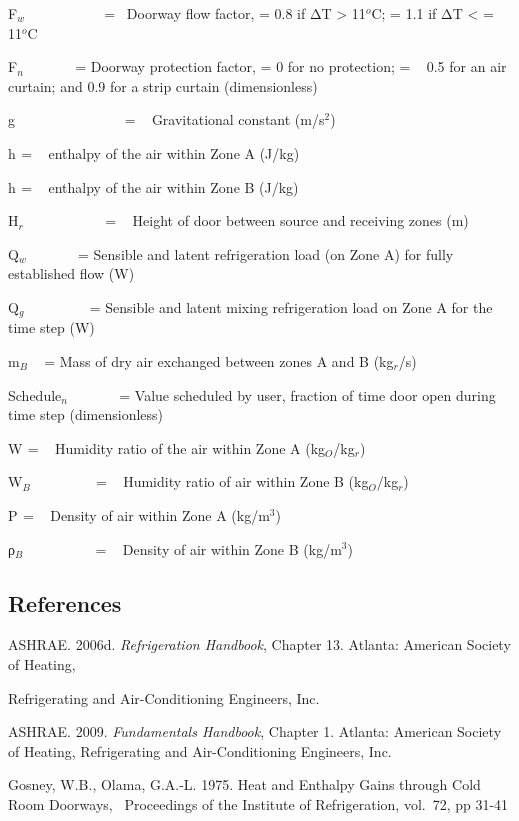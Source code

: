 F\(_{w}\) ~~~~~~~~~~ = ~Doorway flow factor, = 0.8 if ΔT \textgreater{} 11\(^{o}\)C; = 1.1 if ΔT \textless{} = 11\(^{o}\)C

F\(_{n}\) ~~~~~~ = Doorway protection factor, = 0 for no protection; = ~ 0.5 for an air curtain; and 0.9 for a strip curtain (dimensionless)

g~~~~~~~~~~~~~~~ = ~ Gravitational constant (m/s\(^{2}\))

h\(_{ }\) = ~ enthalpy of the air within Zone A (J/kg)

h\(_{ }\) = ~ enthalpy of the air within Zone B (J/kg)

H\(_{r}\)~~~~~~~~~~~ = ~ Height of door between source and receiving zones (m)

Q\(_{w}\) ~~~~~~ = Sensible and latent refrigeration load (on Zone A) for fully established flow (W)

Q\(_{g}\) ~~~~~~~~ = Sensible and latent mixing refrigeration load on Zone A for the time step (W)

m\(_{B}\) ~ = Mass of dry air exchanged between zones A and B (kg\(_{r}\)/s)

Schedule\(_{n}\) ~~~~~~ = Value scheduled by user, fraction of time door open during time step (dimensionless)

W\(_{ }\) = ~ Humidity ratio of the air within Zone A (kg\(_{O}\)/kg\(_{r}\))

W\(_{B}\) ~~~~~~~~ = ~ Humidity ratio of air within Zone B (kg\(_{O}\)/kg\(_{r}\))

Ρ\(_{ }\) = ~ Density of air within Zone A (kg/m\(^{3}\))

ρ\(_{B}\) ~~~~~~~~~ = ~ Density of air within Zone B (kg/m\(^{3}\))

\subsection{References}\label{references}

ASHRAE. 2006d. \emph{Refrigeration Handbook}, Chapter 13. Atlanta: American Society of Heating,

Refrigerating and Air-Conditioning Engineers, Inc.

ASHRAE. 2009. \emph{Fundamentals Handbook}, Chapter 1. Atlanta: American Society of Heating, Refrigerating and Air-Conditioning Engineers, Inc.

Gosney, W.B., Olama, G.A.-L. 1975. Heat and Enthalpy Gains through Cold Room Doorways,~ Proceedings of the Institute of Refrigeration, vol.~72, pp 31-41

